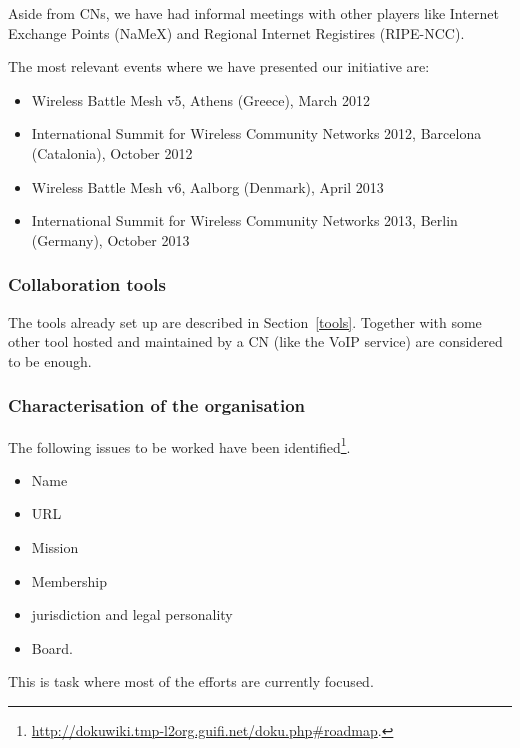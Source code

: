 Aside from CNs, we have had informal meetings with other players like Internet Exchange Points (NaMeX) and Regional Internet Registires (RIPE-NCC).

The most relevant events where we have presented our initiative are:
\begin{itemize}
  \setlength{\itemindent}{2em}
  \item Wireless Battle Mesh v5, Athens (Greece), March 2012
  \item International Summit for Wireless Community Networks 2012, Barcelona (Catalonia), October 2012
  \item Wireless Battle Mesh v6, Aalborg (Denmark), April 2013
  \item International Summit for Wireless Community Networks 2013, Berlin (Germany), October 2013
\end{itemize}


\subsubsection{Collaboration tools}
The tools already set up are described in Section~\ref{tools}. Together with some other tool hosted and maintained by a CN (like the VoIP service) are considered to be enough.

\subsubsection{Characterisation of the organisation}
The following issues to be worked have been identified\footnote{\url{http://dokuwiki.tmp-l2org.guifi.net/doku.php#roadmap}.}.
\begin{itemize}
  \item Name
  \item URL
  \item Mission
  \item Membership
  \item jurisdiction and legal personality
  \item Board.
\end{itemize}
This is task where most of the efforts are currently focused.



